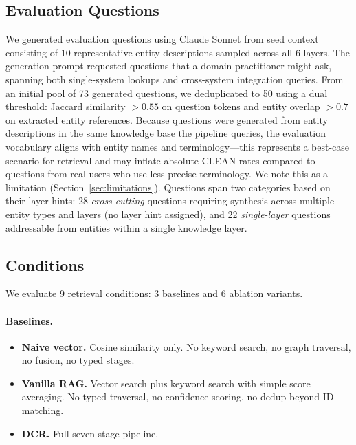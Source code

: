 \documentclass[11pt,a4paper]{article}
\begin{document}
\subsection{Evaluation Questions}

We generated evaluation questions using Claude Sonnet from seed context consisting of 10 representative entity descriptions sampled across all 6 layers. The generation prompt requested questions that a domain practitioner might ask, spanning both single-system lookups and cross-system integration queries. From an initial pool of 73 generated questions, we deduplicated to 50 using a dual threshold: Jaccard similarity $> 0.55$ on question tokens and entity overlap $> 0.7$ on extracted entity references. Because questions were generated from entity descriptions in the same knowledge base the pipeline queries, the evaluation vocabulary aligns with entity names and terminology---this represents a best-case scenario for retrieval and may inflate absolute CLEAN rates compared to questions from real users who use less precise terminology. We note this as a limitation (Section~\ref{sec:limitations}). Questions span two categories based on their layer hints: 28 \emph{cross-cutting} questions requiring synthesis across multiple entity types and layers (no layer hint assigned), and 22 \emph{single-layer} questions addressable from entities within a single knowledge layer.

\subsection{Conditions}
\label{sec:conditions}

We evaluate 9 retrieval conditions: 3 baselines and 6 ablation variants.

\paragraph{Baselines.}
\begin{itemize}[nosep]
  \item \textbf{Naive vector.} Cosine similarity only. No keyword search, no graph traversal, no fusion, no typed stages.
  \item \textbf{Vanilla RAG.} Vector search plus keyword search with simple score averaging. No typed traversal, no confidence scoring, no dedup beyond ID matching.
  \item \textbf{DCR.} Full seven-stage pipeline.
\end{itemize}
\end{document}

